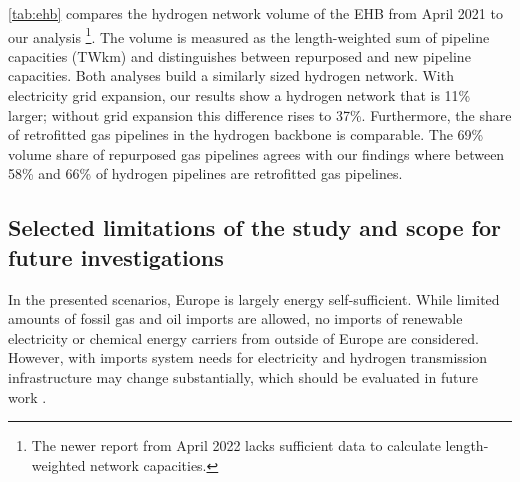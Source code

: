 
\cref{tab:ehb} compares the hydrogen network volume of the EHB from April 2021
to our analysis \cite{gasforclimateExtendingEuropean2021}\footnote{The newer
report from April 2022 \cite{gasforclimateEuropeanHydrogen2022} lacks sufficient
data to calculate length-weighted network capacities.}. The volume is measured
as the length-weighted sum of pipeline capacities (TWkm) and distinguishes
between repurposed and new pipeline capacities. Both analyses build a similarly
sized hydrogen network. With electricity grid expansion, our results show a
hydrogen network that is 11\% larger; without grid expansion this difference
rises to 37\%. Furthermore, the share of retrofitted gas pipelines in the
hydrogen backbone is comparable. The 69\% volume share of repurposed gas
pipelines \cite{gasforclimateExtendingEuropean2021} agrees with our findings
where between 58\% and 66\% of hydrogen pipelines are retrofitted gas pipelines.

\subsection*{Selected limitations of the study and scope for future investigations}


In the presented scenarios, Europe is largely energy self-sufficient. While
limited amounts of fossil gas and oil imports are allowed, no imports of
renewable electricity or chemical energy carriers from outside of Europe are
considered. However, with imports system needs for electricity and hydrogen
transmission infrastructure may change substantially, which should be evaluated
in future work
\cite{fasihiTechnoeconomicAssessment2019,heuserTechnoeconomicAnalysis2019,hamppImportOptions2021}.

